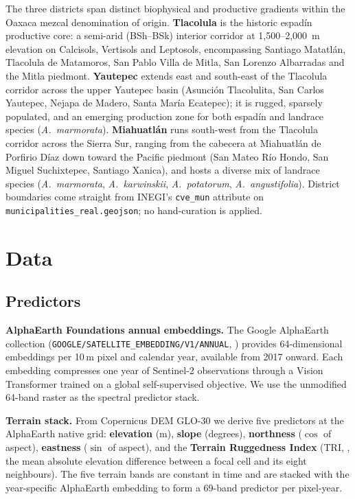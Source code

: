 \documentclass[10pt,a4paper]{article}
\begin{document}
The three districts span distinct biophysical and productive
gradients within the Oaxaca mezcal denomination of origin.
\textbf{Tlacolula} is the historic espad\'in productive core: a
semi-arid (BSh--BSk) interior corridor at 1{,}500--2{,}000~m
elevation on Calcisols, Vertisols and Leptosols, encompassing
Santiago Matatl\'an, Tlacolula de Matamoros, San Pablo Villa de
Mitla, San Lorenzo Albarradas and the Mitla piedmont.
\textbf{Yautepec} extends east and south-east of the Tlacolula
corridor across the upper Yautepec basin (Asunci\'on Tlacolulita,
San Carlos Yautepec, Nejapa de Madero, Santa Mar\'ia Ecatepec); it
is rugged, sparsely populated, and an emerging production zone for
both espad\'in and landrace species (\textit{A.\ marmorata}).
\textbf{Miahuatlán} runs south-west from the Tlacolula corridor
across the Sierra Sur, ranging from the cabecera at Miahuatl\'an
de Porfirio D\'iaz down toward the Pacific piedmont (San Mateo R\'io
Hondo, San Miguel Suchixtepec, Santiago Xanica), and hosts a
diverse mix of landrace species (\textit{A.\ marmorata},
\textit{A.\ karwinskii}, \textit{A.\ potatorum}, \textit{A.\
angustifolia}). District boundaries come straight from INEGI's
\texttt{cve\_mun} attribute on \texttt{municipalities\_real.geojson};
no hand-curation is applied.

\section{Data}\label{sec:data}

\subsection{Predictors}

\textbf{AlphaEarth Foundations annual embeddings.} The Google AlphaEarth
collection
(\texttt{GOOGLE/\allowbreak SATELLITE\_\allowbreak EMBEDDING/\allowbreak V1/\allowbreak ANNUAL},
\citealt{google2024alphaearth}) provides 64-dimensional embeddings per
10\,m pixel and calendar year, available from 2017 onward. Each
embedding compresses one year of Sentinel-2 observations through a
Vision Transformer trained on a global self-supervised objective. We
use the unmodified 64-band raster as the spectral predictor stack.

\textbf{Terrain stack.} From Copernicus DEM GLO-30 we derive five
predictors at the AlphaEarth native grid: \textbf{elevation} (m),
\textbf{slope} (degrees), \textbf{northness} ($\cos$ of aspect),
\textbf{eastness} ($\sin$ of aspect), and the \textbf{Terrain
Ruggedness Index} (TRI, \citealt{riley1999tri}, the mean absolute
elevation difference between a focal cell and its eight neighbours).
The five terrain bands are constant in time and are stacked with the
year-specific AlphaEarth embedding to form a 69-band predictor per
pixel-year.
\end{document}
